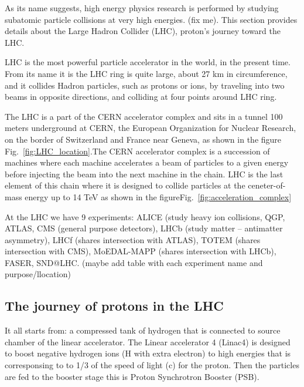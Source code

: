 
As its name suggests, high energy physics research is performed by studying subatomic particle collisions at very high energies. (fix me).
This section provides details about the Large Hadron Collider (LHC), proton's journey toward the LHC. %

LHC is the most powerful particle accelerator in the world, in the present time. 
From its name it is the LHC ring is quite large, about 27 km in circumference, and it collides Hadron particles, such as protons or ions, by traveling into two beams in opposite directions, and colliding at four points around LHC ring.

The LHC is a part of the CERN accelerator complex and sits in a tunnel 100 meters underground at CERN, the European Organization for Nuclear Research, on the border of Switzerland and France near Geneva, as shown in the figure Fig.~\ref{fig:LHC_location}.The CERN accelerator complex is a succession of machines where each machine accelerates a beam of particles to a given energy before injecting the beam into the next machine in the chain. LHC is the last element of this chain where it is designed to collide particles at the ceneter-of-mass energy up to 14 TeV as shown in the figureFig.~\ref{fig:acceleration_complex}

At the LHC we have 9 experiments:
ALICE (study heavy ion collisions, QGP,
ATLAS, CMS (general purpose detectors),
LHCb (study matter – antimatter asymmetry),
LHCf (shares intersection with ATLAS), 
TOTEM (shares intersection with CMS),
MoEDAL-MAPP (shares intersection with LHCb),
FASER,
SND@LHC. (maybe add table with each experiment name and purpose/llocation)

\subsection{The journey of protons in the LHC}
It all starts from: a compressed tank of hydrogen that is connected to source chamber of the linear accelerator. The Linear accelerator 4 (Linac4) is designed to boost negative hydrogen ions (H with extra electron) to high energies that is corresponsing to to 1/3 of the speed of light (c) for the proton. Then the particles are fed to the booster stage this is Proton Synchrotron Booster (PSB).

